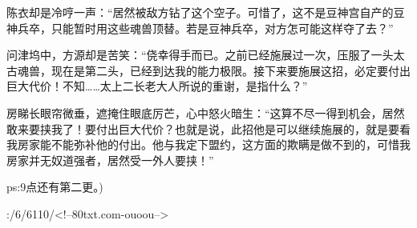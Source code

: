 \begin{this_body}
陈衣却是冷哼一声：“居然被敌方钻了这个空子。可惜了，这不是豆神宫自产的豆神兵卒，只能暂时用这些魂兽顶替。若是豆神兵卒，对方怎可能这样夺了去？”

问津坞中，方源却是苦笑：“侥幸得手而已。之前已经施展过一次，压服了一头太古魂兽，现在是第二头，已经到达我的能力极限。接下来要施展这招，必定要付出巨大代价！不知……太上二长老大人所说的重谢，是指什么？”

房睇长眼帘微垂，遮掩住眼底厉芒，心中怒火暗生：“这算不尽一得到机会，居然敢来要挟我了！要付出巨大代价？也就是说，此招他是可以继续施展的，就是要看我房家能不能弥补他的付出。他与我定下盟约，这方面的欺瞒是做不到的，可惜我房家并无奴道强者，居然受一外人要挟！”

ps:9点还有第二更。)

:/6/6110/<!--80txt.com-ouoou-->

\end{this_body}

